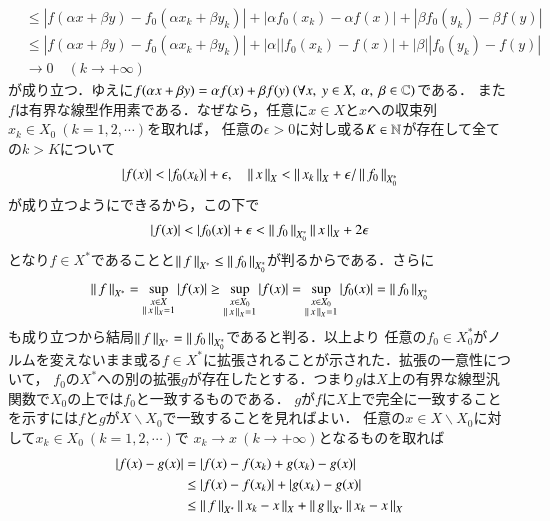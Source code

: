 \begin{prf}
\begin{description}
\begin{align}
			&\leq |f(\alpha x + \beta y) - f_0(\alpha x_k + \beta y_k)| 
				+ |\alpha f_0(x_k) - \alpha f(x)| + |\beta f_0(y_k) - \beta f(y)| \\
			&\leq |f(\alpha x + \beta y) - f_0(\alpha x_k + \beta y_k)| 
				+ |\alpha| |f_0(x_k) - f(x)| + |\beta| |f_0(y_k) - f(y)| \\
			&\longrightarrow 0\quad (k \longrightarrow +\infty)
		\end{align}
		が成り立つ．ゆえに$f(\alpha x + \beta y) = \alpha f(x) + \beta f(y)\ (\forall x,\ y \in X,\ \alpha,\ \beta \in \C)$である．
		また$f$は有界な線型作用素である．なぜなら，任意に$x \in X$と$x$への収束列$x_k \in X_0\ (k = 1,2,\cdots)$を取れば，
		任意の$\epsilon > 0$に対し或る$K \in \mathbb{N}$が存在して全ての$k > K$について
		\begin{align}
			|f(x)| < |f_0(x_k)| + \epsilon, \quad \left\|\, x\, \right\|_{X} < \left\|\, x_k\, \right\|_{X} + \epsilon/\left\|\, f_0\, \right\|_{X_0^*}
		\end{align}
		が成り立つようにできるから，この下で
		\begin{align}
			|f(x)| < |f_0(x)| + \epsilon < \left\|\, f_0\, \right\|_{X_0^*} \left\|\, x\, \right\|_{X} + 2\epsilon
		\end{align}
		となり$f \in X^*$であることと$\left\|\, f\, \right\|_{X^*} \leq \left\|\, f_0\, \right\|_{X_0^*}$が判るからである．さらに
		\begin{align}
			\left\|\, f\, \right\|_{X^*} = \operatorname*{sup}_{\substack{x \in X \\ \left\|\, x\, \right\|_{X} = 1}} |f(x)| 
			\geq \operatorname*{sup}_{\substack{x \in X_0 \\ \left\|\, x\, \right\|_{X} = 1}} |f(x)| 
			= \operatorname*{sup}_{\substack{x \in X_0 \\ \left\|\, x\, \right\|_{X} = 1}} |f_0(x)| = \left\|\, f_0\, \right\|_{X_0^*}
		\end{align}
		も成り立つから結局$\left\|\, f\, \right\|_{X^*} = \left\|\, f_0\, \right\|_{X_0^*}$であると判る．以上より
		任意の$f_0 \in X_0^*$がノルムを変えないまま或る$f \in X^*$に拡張されることが示された．拡張の一意性について，
		$f_0$の$X^*$への別の拡張$g$が存在したとする．つまり$g$は$X$上の有界な線型汎関数で$X_0$の上では$f_0$と一致するものである．
		$g$が$f$に$X$上で完全に一致することを示すには$f$と$g$が$X \backslash X_0$で一致することを見ればよい．
		任意の$x \in X \backslash X_0$に対して$x_k \in X_0\ (k = 1,2,\cdots)$で
		$x_k \longrightarrow x\ (k \longrightarrow +\infty)$となるものを取れば
		\begin{align}
			\left| f(x) - g(x) \right| &= \left| f(x) - f(x_k) + g(x_k) - g(x) \right| \\
			&\leq \left| f(x) - f(x_k) \right| + \left|g(x_k) - g(x) \right| \\
			&\leq \Norm{f}{X^*}\Norm{x_k - x}{X} + \Norm{g}{X^*}\Norm{x_k - x}{X} \\

\end{align}
\end{description}
\end{prf}
